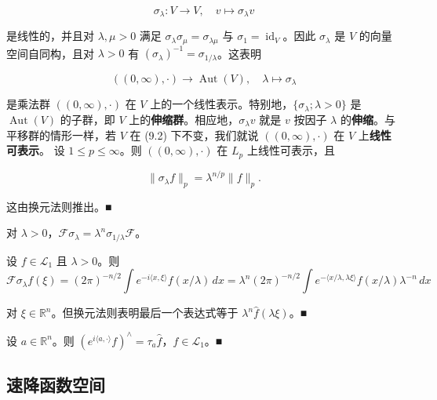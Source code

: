 \begin{remark}
\begin{items}
\[
\sigma_\lambda: V \to V , \quad v \mapsto \sigma_\lambda v
\]

是线性的，并且对 $ \lambda,\mu > 0 $ 满足 $ \sigma_\lambda\sigma_\mu = \sigma_{\lambda\mu} $ 与 $ \sigma_1 = \operatorname{id}_V $。因此 $ \sigma_\lambda $ 是 $ V $ 的向量空间自同构，且对 $ \lambda > 0 $ 有 $ (\sigma_\lambda)^{-1} = \sigma_{1/\lambda} $。这表明

\[
((0,\infty),\cdot) \to \operatorname{Aut}(V) , \quad \lambda \mapsto \sigma_\lambda
\]

是乘法群 $ ((0,\infty),\cdot) $ 在 $ V $ 上的一个线性表示。特别地，$ \{\sigma_\lambda ; \lambda > 0\} $ 是 $ \operatorname{Aut}(V) $ 的子群，即 $ V $ 上的\textbf{伸缩群}。相应地，$ \sigma_\lambda v $ 就是 $ v $ 按因子 $ \lambda $ 的\textbf{伸缩}。与平移群的情形一样，若 $ V $ 在 (9.2) 下不变，我们就说 $ ((0,\infty),\cdot) $ 在 $ V $ 上\textbf{线性可表示}。
设 $ 1 \le p \le \infty $。则 $ ((0,\infty),\cdot) $ 在 $ L_p $ 上线性可表示，且

\[
\|\sigma_\lambda f\|_p = \lambda^{n/p}\|f\|_p .
\]

\proofhead
这由换元法则推出。\nobreak\hspace{0.35em}■
\item

对 $ \lambda > 0 $，$ \mathcal{F}\sigma_\lambda = \lambda^n\sigma_{1/\lambda}\mathcal{F} $。

\proofhead
设 $ f \in \mathcal{L}_1 $ 且 $ \lambda > 0 $。则
\[
\mathcal{F}\sigma_\lambda f(\xi) = (2\pi)^{-n/2}\int e^{-i\langle x,\xi\rangle} f(x/\lambda)\,dx = \lambda^n(2\pi)^{-n/2}\int e^{-\langle x/\lambda,\lambda\xi\rangle} f(x/\lambda)\lambda^{-n}\,dx
\]

对 $ \xi \in \mathbb{R}^n $。但换元法则表明最后一个表达式等于 $ \lambda^n\hat{f}(\lambda\xi) $。\nobreak\hspace{0.35em}■

\item

设 $ a \in \mathbb{R}^n $。则 $ (e^{i\langle a,\cdot\rangle}f)^{\wedge} = \tau_a\hat{f} $，$ f \in \mathcal{L}_1 $。\nobreak\hspace{0.35em}■

\end{items}

\end{remark}

\subsection*{速降函数空间}

